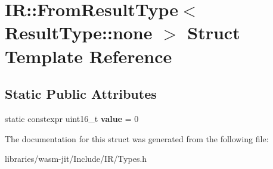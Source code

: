 \hypertarget{struct_i_r_1_1_from_result_type_3_01_result_type_1_1none_01_4}{}\section{IR\+:\+:From\+Result\+Type$<$ Result\+Type\+:\+:none $>$ Struct Template Reference}
\label{struct_i_r_1_1_from_result_type_3_01_result_type_1_1none_01_4}
\subsection*{Static Public Attributes}
\begin{DoxyCompactItemize}
\item 
\mbox{\label{struct_i_r_1_1_from_result_type_3_01_result_type_1_1none_01_4_a5f32cb48a5cba8c9045c393bbcd88764}} 
static constexpr uint16\+\_\+t {\bfseries value} = 0
\end{DoxyCompactItemize}


The documentation for this struct was generated from the following file\+:\begin{DoxyCompactItemize}
\item 
libraries/wasm-\/jit/\+Include/\+I\+R/Types.\+h\end{DoxyCompactItemize}
